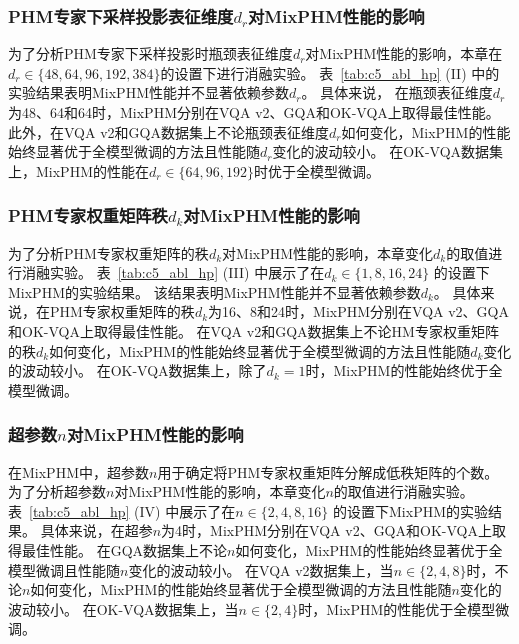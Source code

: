 \subsubsection{PHM专家下采样投影表征维度$d_r$对MixPHM性能的影响}
为了分析PHM专家下采样投影时瓶颈表征维度$d_r$对MixPHM性能的影响，本章在$d_r \in \{48, 64, 96, 192, 384\}$的设置下进行消融实验。
表~\ref{tab:c5_abl_hp} (II) 中的实验结果表明MixPHM性能并不显著依赖参数$d_r$。
具体来说，
在瓶颈表征维度$d_r$为48、64和64时，MixPHM分别在VQA v2、GQA和OK-VQA上取得最佳性能。
此外，在VQA v2和GQA数据集上不论瓶颈表征维度$d_r$如何变化，MixPHM的性能始终显著优于全模型微调的方法且性能随$d_r$变化的波动较小。
在OK-VQA数据集上，MixPHM的性能在$d_r \in \{64, 96, 192\}$时优于全模型微调。

\subsubsection{PHM专家权重矩阵秩$d_k$对MixPHM性能的影响}
为了分析PHM专家权重矩阵的秩$d_k$对MixPHM性能的影响，本章变化$d_k$的取值进行消融实验。
表~\ref{tab:c5_abl_hp} (III) 中展示了在$d_k \in \{1, 8, 16, 24\}$ 的设置下MixPHM的实验结果。
该结果表明MixPHM性能并不显著依赖参数$d_k$。
具体来说，在PHM专家权重矩阵的秩$d_k$为16、8和24时，MixPHM分别在VQA v2、GQA和OK-VQA上取得最佳性能。
在VQA v2和GQA数据集上不论HM专家权重矩阵的秩$d_k$如何变化，MixPHM的性能始终显著优于全模型微调的方法且性能随$d_k$变化的波动较小。
在OK-VQA数据集上，除了$d_k =1$时，MixPHM的性能始终优于全模型微调。


\subsubsection{超参数$n$对MixPHM性能的影响}
在MixPHM中，超参数$n$用于确定将PHM专家权重矩阵分解成低秩矩阵的个数。
为了分析超参数$n$对MixPHM性能的影响，本章变化$n$的取值进行消融实验。
表~\ref{tab:c5_abl_hp} (IV) 中展示了在$n \in \{2, 4, 8, 16\}$ 的设置下MixPHM的实验结果。
具体来说，在超参$n$为4时，MixPHM分别在VQA v2、GQA和OK-VQA上取得最佳性能。
在GQA数据集上不论$n$如何变化，MixPHM的性能始终显著优于全模型微调且性能随$n$变化的波动较小。
在VQA v2数据集上，当$n \in \{2, 4, 8\}$时，不论$n$如何变化，MixPHM的性能始终显著优于全模型微调的方法且性能随$n$变化的波动较小。
在OK-VQA数据集上，当$n \in \{2, 4\}$时，MixPHM的性能优于全模型微调。


